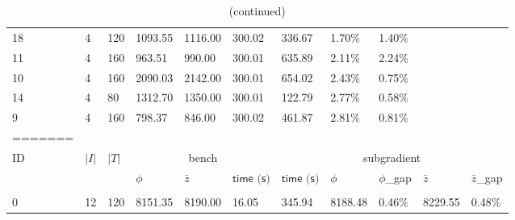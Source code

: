 \documentclass[../main]{subfiles}
\begin{document}
\begin{longtable}{l|ll|lll|lllll}
   18                  & 4                          & 120                        & 1093.55                   & 1116.00  & 300.02              & 336.67  & 1.70\%  & 1.40\% \\
   11                  & 4                          & 160                        & 963.51                    & 990.00   & 300.01              & 635.89  & 2.11\%  & 2.24\% \\
   10                  & 4                          & 160                        & 2090.03                   & 2142.00  & 300.01              & 654.02  & 2.43\%  & 0.75\% \\
   14                  & 4                          & 80                         & 1312.70                   & 1350.00  & 300.01              & 122.79  & 2.77\%  & 0.58\% \\
   9                   & 4                          & 160                        & 798.37                    & 846.00   & 300.02              & 461.87  & 2.81\%  & 0.81\% \\
=======
   \label{tab:comp_repair_cases}}                                                                                                                                                                                          \\
   \toprule
   \multirow{2}{*}{ID} & \multirow{2}{*}{$|I|$}          & \multirow{2}{*}{$|T|$}
                       & \multicolumn{3}{c}{bench}
                       & \multicolumn{5}{c}{subgradient}                                                                                                                                                                   \\
   {}                  & {}                              & {}
                       & $\phi$                          & $\bar z$               & $\textsf{time (s)}$
                       & $\textsf{time (s)}$             & $\phi$                 & $\phi$\_gap         & $\bar z$ & $\bar z$\_gap                                                                                         \\
   \endfirsthead
   \caption[]{(continued)}                                                                                                                                                                                                 \\
   \endhead
   \midrule
   0                   & 12                              & 120                    & 8151.35             & 8190.00  & 16.05         & 345.94                     & \cellcolor{green!25}8188.48 & 0.46\%  & 8229.55 & 0.48\% \\

\end{longtable}
\end{document}

